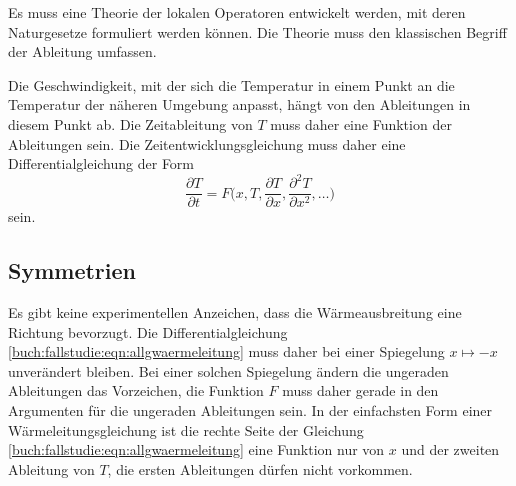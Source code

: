 \begin{aufgabe}
Es muss eine Theorie der lokalen Operatoren entwickelt werden, mit deren
Naturgesetze formuliert werden können.
Die Theorie muss den klassischen Begriff der Ableitung umfassen.
\end{aufgabe}

Die Geschwindigkeit, mit der sich die Temperatur in einem Punkt
an die Temperatur der näheren Umgebung anpasst, hängt von den
Ableitungen in diesem Punkt ab.
Die Zeitableitung von $T$ muss daher eine Funktion der Ableitungen
sein.
Die Zeitentwicklungsgleichung muss daher eine Differentialgleichung
der Form
\begin{equation}
\frac{\partial T}{\partial t}
=
F\biggl(x,
T,
\frac{\partial T}{\partial x},
\frac{\partial^2 T}{\partial x^2},
\dots
\biggr)
\label{buch:fallstudie:eqn:allgwaermeleitung}
\end{equation}
sein.

%
%
\subsection{Symmetrien}
Es gibt keine experimentellen Anzeichen, dass die Wärmeausbreitung
eine Richtung bevorzugt.
%
Die Differentialgleichung
\eqref{buch:fallstudie:eqn:allgwaermeleitung}
muss daher bei einer Spiegelung $x\mapsto -x$ unverändert bleiben.
Bei einer solchen Spiegelung ändern die ungeraden Ableitungen
das Vorzeichen, die Funktion $F$ muss daher gerade in den Argumenten
für die ungeraden Ableitungen sein.
In der einfachsten Form einer Wärmeleitungsgleichung ist die rechte
Seite der Gleichung \eqref{buch:fallstudie:eqn:allgwaermeleitung}
eine Funktion nur von $x$ und der zweiten Ableitung von $T$, die
ersten Ableitungen dürfen nicht vorkommen.

%
%
